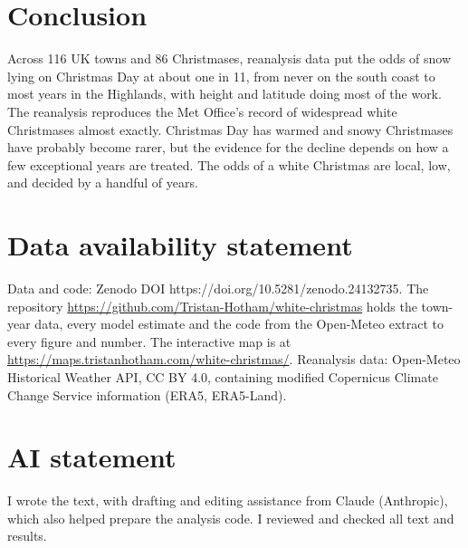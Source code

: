 \documentclass[11pt,a4paper]{article}
\begin{document}
\section{Conclusion}\label{sec:conc}
Across 116 UK towns and 86 Christmases, reanalysis data put the odds of snow lying on Christmas Day at about one in 11, from never on the south coast to most years in the Highlands, with height and latitude doing most of the work. The reanalysis reproduces the Met Office's record of widespread white Christmases almost exactly. Christmas Day has warmed and snowy Christmases have probably become rarer, but the evidence for the decline depends on how a few exceptional years are treated. The odds of a white Christmas are local, low, and decided by a handful of years.

\section*{Data availability statement}
Data and code: Zenodo DOI https://doi.org/10.5281/zenodo.24132735. The repository \url{https://github.com/Tristan-Hotham/white-christmas} holds the town-year data, every model estimate and the code from the Open-Meteo extract to every figure and number. The interactive map is at \url{https://maps.tristanhotham.com/white-christmas/}. Reanalysis data: Open-Meteo Historical Weather API, CC BY 4.0, containing modified Copernicus Climate Change Service information (ERA5, ERA5-Land).

\section*{AI statement}
I wrote the text, with drafting and editing assistance from Claude (Anthropic), which also helped prepare the analysis code. I reviewed and checked all text and results.
\end{document}
